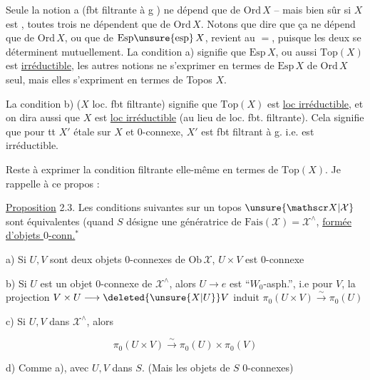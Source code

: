 Seule la notion a (fbt  filtrante à g ) ne dépend que de $\mathrm{Ord}\,X$ -- mais bien sûr si $X$ est , toutes trois ne dépendent que de $\mathrm{Ord}\,X$. Notons que dire que ça ne dépend que de $\mathrm{Ord}\,X$, ou que de $\mathrm{Esp}\unsure{\mathrm{esp}}\,X$, revient au $=$, puisque les deux se déterminent mutuellement. La condition a) signifie que $\mathrm{Esp}\,X$, ou aussi $\mathrm{Top}(X)$ est \uline{irréductible},  les  autres notions ne  s'exprimer en termes de $\mathrm{Esp}\,X$  de $\mathrm{Ord}\,X$ seul, mais elles s'expriment en termes de Topos $X$.

La condition b) ($X$ loc. fbt filtrante) signifie que $\mathrm{Top}(X)$ est \uline{loc irréductible}, et on dira aussi que $X$ est \uline{loc irréductible} (au lieu de loc. fbt. filtrante). Cela signifie que pour tt $X'$ étale sur $X$ et $0$-connexe, $X'$ est fbt filtrant à g. i.e. est irréductible.

Reste à exprimer la condition filtrante elle-même en termes de $\mathrm{Top}(X)$. Je rappelle à ce propos :

\uline{Proposition} 2.3. Les conditions suivantes sur un topos $\unsure{\mathscr X|\mathcal X}$ sont équivalentes (quand $S$  désigne une  génératrice de $\mathrm{Fais}(\mathscr X)=\mathscr X^{\wedge}$\deleted{\unsure{,}}, \uline{formée d'objets $0$-conn.}$^{*}$


a) Si $U,V$ sont deux objets $0$-connexes de $\mathrm{Ob}\,\mathscr X$, $U\times V$ est $0$-connexe

b) Si $U$ est un objet $0$-connexe de $\mathscr X^{\wedge}$, alors $U\longrightarrow e$ est ``$W_0$-asph.'', i.e pour  $V$, la projection $V\times U\longrightarrow\deleted{\unsure{X|U}}V$ induit $\pi_0(U\times V)\xrightarrow{\sim}\pi_0(U)$


c) Si $U,V$ dans $\mathscr X^{\wedge}$, alors

\[
\pi_0(U\times V)\xrightarrow{\sim}\pi_0(U)\times\pi_0(V)
\]

d) Comme a), avec $U,V$ dans $S$. (Mais   les objets de $S$ $0$-connexes)
